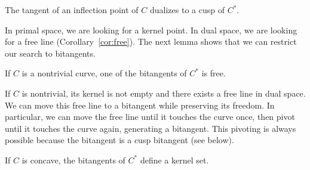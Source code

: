 \documentclass[12pt]{article}
\begin{document}
\begin{lemma}
The tangent of an inflection point of $C$ dualizes to a cusp of $C^*$.
\end{lemma}



In primal space, we are looking for a kernel point.
In dual space, we are looking for a free line (Corollary~\ref{cor:free}).
The next lemma shows that we can restrict our search to bitangents.

\begin{lemma}
\label{lem:existence}
If $C$ is a nontrivial curve,
one of the bitangents of $C^*$ is free.
\end{lemma}
\prf
If $C$ is nontrivial, its kernel is not empty and 
there exists a free line in dual space.
We can move this free line to a bitangent while preserving its freedom.
In particular, we can move the free line until it touches the curve once,
then pivot until it touches the curve again, generating a bitangent.
This pivoting is always possible because the bitangent is a cusp
bitangent (see below).
%
%
\QED

\vspace{-.3in}

\begin{corollary}
If $C$ is concave,
the bitangents of $C^*$ define a kernel set.
\end{corollary}
\end{document}
